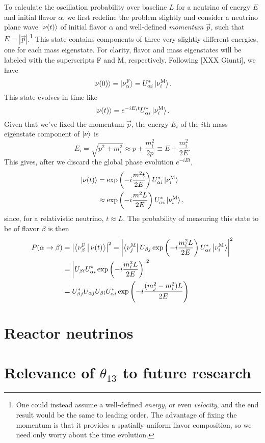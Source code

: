 \documentclass[../thesis.tex]{subfiles}
\begin{document}
To calculate the oscillation probability over baseline $L$ for a neutrino of energy $E$ and initial flavor $\alpha$, we first redefine the problem slightly and consider a neutrino plane wave $\ket{\nu(t)}$ of initial flavor $\alpha$ and well-defined \emph{momentum} $\vec{p}$, such that $E = |\vec{p}|$.\footnote{One could instead assume a well-defined \emph{energy}, or even \emph{velocity}, and the end result would be the same to leading order. The advantage of fixing the momentum is that it provides a spatially uniform flavor composition, so we need only worry about the time evolution.} This state contains components of three very slightly different energies, one for each mass eigenstate. For clarity, flavor and mass eigenstates will be labeled with the superscripts F and M, respectively. Following [XXX Giunti], we have
\[\ket{\nu(0)} = \ket{\nu^{\mathrm{F}}_\alpha} = U^*_{\alpha i} \ket{\nu^{\mathrm{M}}_i}. \]
This state evolves in time like
\[\ket{\nu(t)} = e^{-i E_i t} U^*_{\alpha i} \ket{\nu^{\mathrm{M}}_i}.\]
Given that we've fixed the momentum $\vec{p}$, the energy $E_i$ of the $i$th mass eigenstate component of $\ket{\nu}$ is
\[E_i = \sqrt{p^2 + m_i^2} \approx p + \frac{m_i^2}{2p} \equiv E + \frac{m_i^2}{2E}.\]
This gives, after we discard the global phase evolution $e^{-iEt}$,
\begin{align*}
  \ket{\nu(t)} &= \exp\left(-i\frac{m^2t}{2E}\right) U^*_{\alpha i} \ket{\nu^{\mathrm{M}}_i} \\
               &\approx \exp\left(-i\frac{m^2L}{2E}\right) U^*_{\alpha i} \ket{\nu^{\mathrm{M}}_i},
\end{align*}
since, for a relativistic neutrino, $t \approx L$. The probability of measuring this state to be of flavor $\beta$ is then
\begin{align*}
  P(\alpha \rightarrow \beta)
  &= \left|\Braket{\nu^{\mathrm{F}}_\beta|\nu(t)}\right|^2
    = \left| \Bra{\nu^{\mathrm{M}}_j} U_{\beta j} \exp\left( -i\frac{m_i^2L}{2E} \right) U^*_{\alpha i}\Ket{\nu^{\mathrm{M}}_i}\right|^2 \\
  &=  \left| U_{\beta i} U^*_{\alpha i} \exp\left( -i \frac{m_i^2L}{2E} \right)\right|^2 \\
  &= U^*_{\beta j} U_{\alpha j} U_{\beta i} U^*_{\alpha i} \exp\left( -i \frac{(m_j^2 - m_i^2)L}{2E} \right)
\end{align*}

\section{Reactor neutrinos}
\label{sec:introReactor}

\section{Relevance of $\theta_{13}$ to future research}
\label{sec:futureRelevance}
\end{document}

